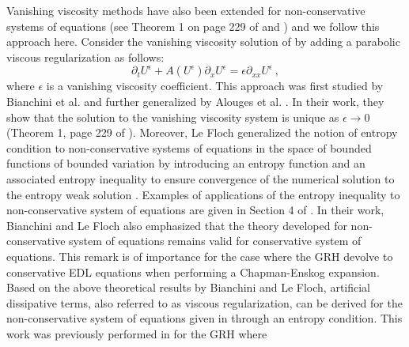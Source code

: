 \documentclass[times,doublespace]{fldauth}%
\begin{document}
%
Vanishing viscosity methods have also been extended for non-conservative systems of equations (see Theorem 1 on page 229 of \cite{bianchini_bressan_2005} and \cite{alouges_merlet_2004,lefloch_1988}) 
and we follow this approach here.
Consider the  vanishing viscosity solution of  by adding a parabolic viscous regularization as follows:
%
\begin{equation}
\label{eq:nc-syst-eq-visc}
\partial_t U^\epsilon + A(U^\epsilon) \partial_x U^\epsilon = \epsilon \partial_{xx} U^\epsilon \ , \nonumber
\end{equation}
%
where $\epsilon$ is a vanishing viscosity coefficient. This approach was first studied by Bianchini et al. \cite{bianchini_bressan_2005} and 
further generalized by Alouges et al. \cite{alouges_merlet_2004}. In their work, they show that the solution to the 
vanishing viscosity system is unique as $\epsilon \to 0$ (Theorem 1, page 229 of \cite{bianchini_bressan_2005}). 
%
Moreover, Le Floch generalized the notion of entropy 
condition to non-conservative systems of equations in the space of bounded functions of bounded variation by introducing an entropy function 
and an associated entropy inequality to ensure convergence of the numerical solution to the entropy weak solution \cite{lefloch_1988}. Examples of applications of the
entropy inequality to non-conservative system of equations are given in Section 4 of \cite{lefloch_1988}. In their work, Bianchini and Le Floch also emphasized that the theory developed for non-conservative system of equations remains valid for conservative system of equations. This remark is of importance for the case where the GRH devolve to conservative EDL equations when performing a Chapman-Enskog expansion. Based on the above theoretical results by Bianchini and Le Floch, artificial dissipative terms, also referred to as viscous regularization, can be derived for the non-conservative system of equations given in  through an entropy condition. This work was previously performed in \cite{our_jcp_radhy_paper} for the GRH where 
\end{document}
